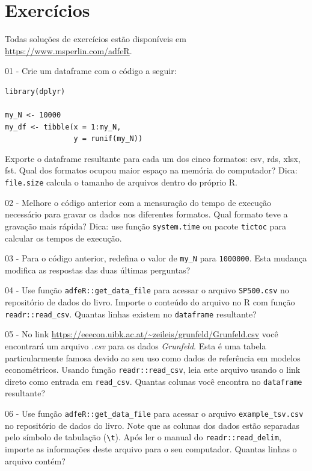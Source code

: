 \documentclass[
  11pt,
]{book}
\begin{document}
\hypertarget{exerc-importacao-exportacao}{%
\section{Exercícios}\label{exerc-importacao-exportacao}}

Todas soluções de exercícios estão disponíveis em \url{https://www.msperlin.com/adfeR}.

01 -
Crie um dataframe com o código a seguir:

\begin{verbatim}
library(dplyr)

my_N <- 10000
my_df <- tibble(x = 1:my_N,
                y = runif(my_N))
\end{verbatim}

Exporte o dataframe resultante para cada um dos cinco formatos: csv, rds, xlsx, fst. Qual dos formatos ocupou maior espaço na memória do computador? Dica: \texttt{file.size} calcula o tamanho de arquivos dentro do próprio R.

02 -
Melhore o código anterior com a mensuração do tempo de execução necessário para gravar os dados nos diferentes formatos. Qual formato teve a gravação mais rápida? Dica: use função \texttt{system.time} ou pacote \texttt{tictoc} para calcular os tempos de execução.

03 -
Para o código anterior, redefina o valor de \texttt{my\_N} para \texttt{1000000}. Esta mudança modifica as respostas das duas últimas perguntas?

04 -
Use função \texttt{adfeR::get\_data\_file} para acessar o arquivo \texttt{SP500.csv} no repositório de dados do livro. Importe o conteúdo do arquivo no R com função \texttt{readr::read\_csv}. Quantas linhas existem no \texttt{dataframe} resultante?

05 -
No link \url{https://eeecon.uibk.ac.at/~zeileis/grunfeld/Grunfeld.csv} você encontrará um arquivo \emph{.csv} para os dados \emph{Grunfeld}. Esta é uma tabela particularmente famosa devido ao seu uso como dados de referência em modelos econométricos. Usando função \texttt{readr::read\_csv}, leia este arquivo usando o link direto como entrada em \texttt{read\_csv}. Quantas colunas você encontra no \texttt{dataframe} resultante?

06 -
Use função \texttt{adfeR::get\_data\_file} para acessar o arquivo \texttt{example\_tsv.csv} no repositório de dados do livro. Note que as colunas dos dados estão separadas pelo símbolo de tabulação (\texttt{\textquotesingle{}\textbackslash{}t\textquotesingle{}}). Após ler o manual do \texttt{readr::read\_delim}, importe as informações deste arquivo para o seu computador. Quantas linhas o arquivo contém?
\end{document}
